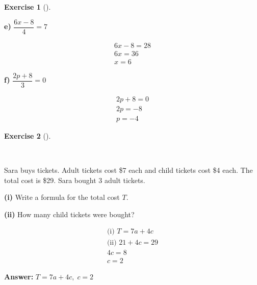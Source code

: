 \documentclass[
  letterpaper,
  DIV=11,
  numbers=noendperiod]{scrreprt}
\theoremstyle{definition}
\newtheorem{exercise}{Exercise}[chapter]
\theoremstyle{remark}
\begin{document}
\begin{exercise}[]
\begin{tcolorbox}
\textbf{e)} \(\displaystyle \dfrac{6x - 8}{4} = 7\)

\begin{align*}
6x - 8 = 28 \\ 6x = 36 \\ x = 6
\end{align*}

\textbf{f)} \(\displaystyle \dfrac{2p + 8}{3} = 0\)

\begin{align*}
2p + 8 = 0 \\ 2p = -8 \\ p = -4
\end{align*}

\end{tcolorbox}

\end{exercise}

\begin{exercise}[]\protect\hypertarget{exr-u5-17-1}{}\label{exr-u5-17-1}

~

Sara buys tickets. Adult tickets cost \$7 each and child tickets cost
\$4 each. The total cost is \$29. Sara bought 3 adult tickets.

\textbf{(i)} Write a formula for the total cost \(T\).

\textbf{(ii)} How many child tickets were bought?

\begin{tcolorbox}[enhanced jigsaw, opacitybacktitle=0.6, coltitle=black, arc=.35mm, colframe=quarto-callout-tip-color-frame, colback=white, bottomrule=.15mm, left=2mm, colbacktitle=quarto-callout-tip-color!10!white, titlerule=0mm, opacityback=0, title=\textcolor{quarto-callout-tip-color}{\faLightbulb}\hspace{0.5em}{🔍 View Solution}, leftrule=.75mm, breakable, rightrule=.15mm, bottomtitle=1mm, toptitle=1mm, toprule=.15mm]

\begin{align*}
\text{(i) } T = 7a + 4c \\ \text{(ii) } 21 + 4c = 29 \\ 4c = 8 \\ c = 2
\end{align*}

\textbf{Answer:} \(T = 7a + 4c,\; c = 2\)

\end{tcolorbox}

\end{exercise}
\end{document}
